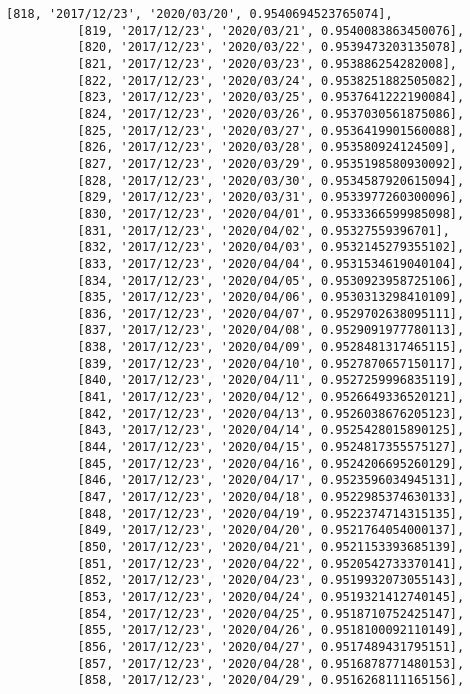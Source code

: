 \documentclass[11pt]{article}
\begin{document}
\begin{Verbatim}[commandchars=\\\{\}]
          [818, '2017/12/23', '2020/03/20', 0.9540694523765074],
          [819, '2017/12/23', '2020/03/21', 0.9540083863450076],
          [820, '2017/12/23', '2020/03/22', 0.9539473203135078],
          [821, '2017/12/23', '2020/03/23', 0.953886254282008],
          [822, '2017/12/23', '2020/03/24', 0.9538251882505082],
          [823, '2017/12/23', '2020/03/25', 0.9537641222190084],
          [824, '2017/12/23', '2020/03/26', 0.9537030561875086],
          [825, '2017/12/23', '2020/03/27', 0.9536419901560088],
          [826, '2017/12/23', '2020/03/28', 0.953580924124509],
          [827, '2017/12/23', '2020/03/29', 0.9535198580930092],
          [828, '2017/12/23', '2020/03/30', 0.9534587920615094],
          [829, '2017/12/23', '2020/03/31', 0.9533977260300096],
          [830, '2017/12/23', '2020/04/01', 0.9533366599985098],
          [831, '2017/12/23', '2020/04/02', 0.95327559396701],
          [832, '2017/12/23', '2020/04/03', 0.9532145279355102],
          [833, '2017/12/23', '2020/04/04', 0.9531534619040104],
          [834, '2017/12/23', '2020/04/05', 0.9530923958725106],
          [835, '2017/12/23', '2020/04/06', 0.9530313298410109],
          [836, '2017/12/23', '2020/04/07', 0.9529702638095111],
          [837, '2017/12/23', '2020/04/08', 0.9529091977780113],
          [838, '2017/12/23', '2020/04/09', 0.9528481317465115],
          [839, '2017/12/23', '2020/04/10', 0.9527870657150117],
          [840, '2017/12/23', '2020/04/11', 0.9527259996835119],
          [841, '2017/12/23', '2020/04/12', 0.9526649336520121],
          [842, '2017/12/23', '2020/04/13', 0.9526038676205123],
          [843, '2017/12/23', '2020/04/14', 0.9525428015890125],
          [844, '2017/12/23', '2020/04/15', 0.9524817355575127],
          [845, '2017/12/23', '2020/04/16', 0.9524206695260129],
          [846, '2017/12/23', '2020/04/17', 0.9523596034945131],
          [847, '2017/12/23', '2020/04/18', 0.9522985374630133],
          [848, '2017/12/23', '2020/04/19', 0.9522374714315135],
          [849, '2017/12/23', '2020/04/20', 0.9521764054000137],
          [850, '2017/12/23', '2020/04/21', 0.9521153393685139],
          [851, '2017/12/23', '2020/04/22', 0.9520542733370141],
          [852, '2017/12/23', '2020/04/23', 0.9519932073055143],
          [853, '2017/12/23', '2020/04/24', 0.9519321412740145],
          [854, '2017/12/23', '2020/04/25', 0.9518710752425147],
          [855, '2017/12/23', '2020/04/26', 0.9518100092110149],
          [856, '2017/12/23', '2020/04/27', 0.9517489431795151],
          [857, '2017/12/23', '2020/04/28', 0.9516878771480153],
          [858, '2017/12/23', '2020/04/29', 0.9516268111165156],

\end{Verbatim}
\end{document}
